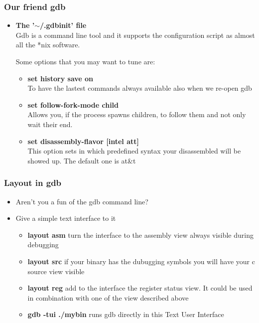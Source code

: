 \documentclass[]{beamer}
\begin{document}
\begin{frame}
  \frametitle{Our friend gdb}
  \begin{itemize}
  \item{{\bf The '$\sim$/.gdbinit' file}}\\
    Gdb is a command line tool and it supports the configuration script as almost all the *nix software.

    Some options that you may want to tune are:
    \begin{itemize}
    \item{{\bf set history save on}}\\
      To have the lastest commands always available also when we re-open gdb
    \item{{\bf set follow-fork-mode child}}\\
      Allows you, if the process spawns children, to follow them and not only wait their end.
    \item{{\bf set disassembly-flavor [intel \textpipe{}  att]}}\\
      This option sets in which predefined syntax your disassembled will be showed up. The default one is at\&t
    \end{itemize}
  \end{itemize}
\end{frame}

\begin{frame}
  \frametitle{Layout in gdb}
  \begin{itemize}
  \item{Aren't you a fun of the gdb command line?}
  \item{Give a simple text interface to it}
    \begin{itemize}
    \item{{\bf layout asm} turn the interface to the assembly view always visible during debugging}
    \item{{\bf layout src} if your binary has the dubugging symbols you will have your c source view visible}
    \item{{\bf layout reg} add to the interface the register status view. It could be used in combination with one of the view described above}
    \item{{\bf gdb -tui ./mybin} runs gdb directly in this Text User Interface}
    \end{itemize}
  \end{itemize}
\end{frame}
\end{document}
